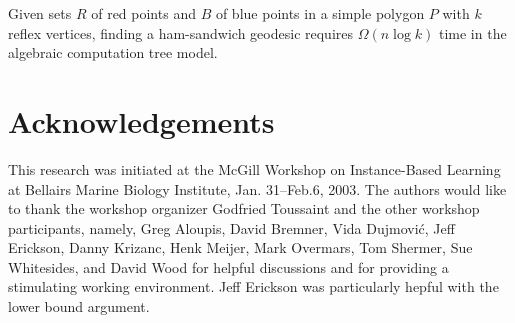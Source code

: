 \documentclass[charterfonts,lotsofwhite]{patmorin}
\begin{document}
\begin{thm}
Given sets $R$ of red points and $B$ of blue points in a simple
polygon $P$ with $k$ reflex vertices, finding a ham-sandwich geodesic
requires $\Omega(n\log k)$ time in the algebraic computation tree
model.
\end{thm}


\section*{Acknowledgements}

This research was initiated at the McGill Workshop on 
Instance-Based Learning at Bellairs Marine Biology Institute, Jan.
31--Feb.6, 2003.  The authors would like to thank the workshop
organizer Godfried Toussaint and the other workshop
participants, namely, 
   Greg Aloupis,
   David Bremner,
   Vida Dujmovi\'c,
   Jeff Erickson,
   Danny Krizanc,
   Henk Meijer,
   Mark Overmars,
   Tom Shermer,
   Sue Whitesides, 
and
   David Wood for helpful
discussions and for providing a stimulating working environment.  Jeff
Erickson was particularly hepful with the lower bound argument.



\end{document}
